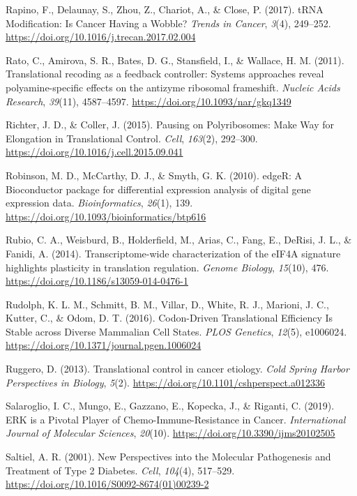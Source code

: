 \documentclass[12pt,openany]{book}
\begin{document}
\hypertarget{ref-Rapino2017}{}
Rapino, F., Delaunay, S., Zhou, Z., Chariot, A., \& Close, P. (2017).
tRNA Modification: Is Cancer Having a Wobble? \emph{Trends in Cancer},
\emph{3}(4), 249--252.
\url{https://doi.org/10.1016/j.trecan.2017.02.004}

\hypertarget{ref-Rato2011}{}
Rato, C., Amirova, S. R., Bates, D. G., Stansfield, I., \& Wallace, H.
M. (2011). Translational recoding as a feedback controller: Systems
approaches reveal polyamine-specific effects on the antizyme ribosomal
frameshift. \emph{Nucleic Acids Research}, \emph{39}(11), 4587--4597.
\url{https://doi.org/10.1093/nar/gkq1349}

\hypertarget{ref-Richter2015}{}
Richter, J. D., \& Coller, J. (2015). Pausing on Polyribosomes: Make Way
for Elongation in Translational Control. \emph{Cell}, \emph{163}(2),
292--300. \url{https://doi.org/10.1016/j.cell.2015.09.041}

\hypertarget{ref-Robinson2010}{}
Robinson, M. D., McCarthy, D. J., \& Smyth, G. K. (2010). edgeR: A
Bioconductor package for differential expression analysis of digital
gene expression data. \emph{Bioinformatics}, \emph{26}(1), 139.
\url{https://doi.org/10.1093/bioinformatics/btp616}

\hypertarget{ref-Rubio2014}{}
Rubio, C. A., Weisburd, B., Holderfield, M., Arias, C., Fang, E.,
DeRisi, J. L., \& Fanidi, A. (2014). Transcriptome-wide characterization
of the eIF4A signature highlights plasticity in translation regulation.
\emph{Genome Biology}, \emph{15}(10), 476.
\url{https://doi.org/10.1186/s13059-014-0476-1}

\hypertarget{ref-Rudolph2016}{}
Rudolph, K. L. M., Schmitt, B. M., Villar, D., White, R. J., Marioni, J.
C., Kutter, C., \& Odom, D. T. (2016). Codon-Driven Translational
Efficiency Is Stable across Diverse Mammalian Cell States. \emph{PLOS
Genetics}, \emph{12}(5), e1006024.
\url{https://doi.org/10.1371/journal.pgen.1006024}

\hypertarget{ref-Ruggero2013}{}
Ruggero, D. (2013). Translational control in cancer etiology. \emph{Cold
Spring Harbor Perspectives in Biology}, \emph{5}(2).
\url{https://doi.org/10.1101/cshperspect.a012336}

\hypertarget{ref-Salaroglio2019}{}
Salaroglio, I. C., Mungo, E., Gazzano, E., Kopecka, J., \& Riganti, C.
(2019). ERK is a Pivotal Player of Chemo-Immune-Resistance in Cancer.
\emph{International Journal of Molecular Sciences}, \emph{20}(10).
\url{https://doi.org/10.3390/ijms20102505}

\hypertarget{ref-Saltiel2001}{}
Saltiel, A. R. (2001). New Perspectives into the Molecular Pathogenesis
and Treatment of Type 2 Diabetes. \emph{Cell}, \emph{104}(4), 517--529.
\url{https://doi.org/10.1016/S0092-8674(01)00239-2}
\end{document}
